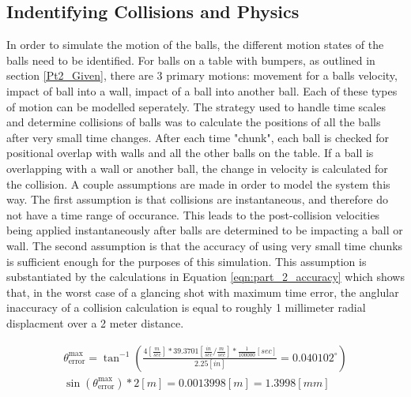 \documentclass[12pt]{article}
\begin{document}
\subsection{Indentifying Collisions and Physics}

In order to simulate the motion of the balls, the different motion states of the balls need to be identified. For balls on a table with bumpers, as outlined in section \ref{Pt2_Given}, there are 3 primary motions: movement for a balls velocity, impact of ball into a wall, impact of a ball into another ball. Each of these types of motion can be modelled seperately. The strategy used to handle time scales and determine collisions of balls was to calculate the positions of all the balls after very small time changes. After each time "chunk", each ball is checked for positional overlap with walls and all the other balls on the table. If a ball is overlapping with a wall or another ball, the change in velocity is calculated for the collision. A couple assumptions are made in order to model the system this way. The first assumption is that collisions are instantaneous, and therefore do not have a time range of occurance. This leads to the post-collision velocities being applied instantaneously after balls are determined to be impacting a ball or wall. The second assumption is that the accuracy of using very small time chunks is sufficient enough for the purposes of this simulation. This assumption is substantiated by the calculations in Equation \ref{eqn:part_2_accuracy} which shows that, in the worst case of a glancing shot with maximum time error, the anglular inaccuracy of a collision calculation is equal to roughly 1 millimeter radial displacment over a 2 meter distance.

\begin{equation}
    \label{eqn:part_2_accuracy}
    \begin{gathered}
        \theta_\text{error}^\text{max} = \tan^{-1}\left( \frac{4 \left[\frac{m}{sec}\right] * 
                                         39.3701 \left[\frac{in}{sec}/\frac{m}{sec}\right] *
                                         \frac{1}{100000} \left[sec\right]}{2.25 \left[in\right]} =
                                         0.040102^{\circ}\right)\\
        \sin(\theta_\text{error}^\text{max}) * 2 \left[m\right] = 0.0013998 \left[m\right] = 1.3998 \left[mm\right]
    \end{gathered}
\end{equation}
\end{document}
